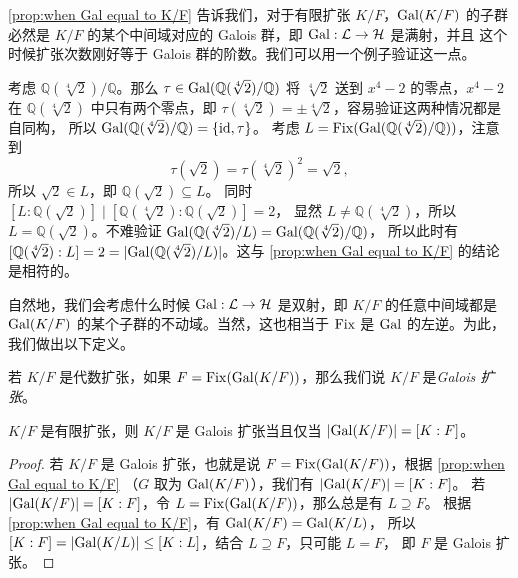 \autoref{prop:when Gal equal to K/F} 告诉我们，对于有限扩张 $K/F$，$\operatorname{Gal}(K/F)$ 的子群
必然是 $K/F$ 的某个中间域对应的 Galois 群，即 $\operatorname{Gal}:\mathcal{L}\to\mathcal{H}$ 是满射，并且
这个时候扩张次数刚好等于 Galois 群的阶数。我们可以用一个例子验证这一点。

\begin{example}
  考虑 $\mathbb{Q}(\sqrt[4]{2})/\mathbb{Q}$。那么 $\tau\in\operatorname{Gal}(\mathbb{Q}(\sqrt[4]{2})/\mathbb{Q})$
  将 $\sqrt[4]{2}$ 送到 $x^4-2$ 的零点，$x^4-2$ 在 $\mathbb{Q}(\sqrt[4]{2})$ 中只有两个零点，即
  $\tau(\sqrt[4]{2})=\pm\sqrt[4]{2}$，容易验证这两种情况都是自同构，
  所以 $\operatorname{Gal}(\mathbb{Q}(\sqrt[4]{2})/\mathbb{Q})=\{\operatorname{id},\tau\}$。
  考虑 $L=\operatorname{Fix}(\operatorname{Gal}(\mathbb{Q}(\sqrt[4]{2})/\mathbb{Q}))$，注意到
  \[
    \tau(\sqrt{2})=\tau(\sqrt[4]{2})  ^2=\sqrt{2},
  \] 
  所以 $\sqrt{2}\in L$，即 $\mathbb{Q}(\sqrt{2})\subseteq L$。
  同时 $[L:\mathbb{Q}(\sqrt{2})]\mid [\mathbb{Q}(\sqrt[4]{2}):\mathbb{Q}(\sqrt{2})]=2$，
  显然 $L\neq \mathbb{Q}(\sqrt[4]{2})$，所以 $L=\mathbb{Q}(\sqrt{2})$。不难验证
  $\operatorname{Gal}(\mathbb{Q}(\sqrt[4]{2})/L)=\operatorname{Gal}(\mathbb{Q}(\sqrt[4]{2})/\mathbb{Q})$，
  所以此时有 
  $[\mathbb{Q}(\sqrt[4]{2}):L]=2=\lvert\operatorname{Gal}(\mathbb{Q}(\sqrt[4]{2})/L)\rvert$。这与
  \autoref{prop:when Gal equal to K/F} 的结论是相符的。
\end{example}

自然地，我们会考虑什么时候 $\operatorname{Gal}:\mathcal{L}\to\mathcal{H}$ 是双射，即 $K/F$
的任意中间域都是 $\operatorname{Gal}(K/F)$ 的某个子群的不动域。当然，这也相当于
$\operatorname{Fix}$ 是 $\operatorname{Gal}$ 的左逆。为此，我们做出以下定义。

\begin{definition}
  若 $K/F$ 是代数扩张，如果 $F=\operatorname{Fix}(\operatorname{Gal}(K/F))$，那么我们说 $K/F$ 是\emph{Galois 扩张}。
\end{definition}

\begin{corollary}\label{coro:finite Galois extension}
  $K/F$ 是有限扩张，则 $K/F$ 是 Galois 扩张当且仅当 $\lvert \operatorname{Gal}(K/F)\rvert=[K:F]$。
\end{corollary}
\begin{proof}
  若 $K/F$ 是 Galois 扩张，也就是说 $F=\operatorname{Fix}(\operatorname{Gal}(K/F))$，根据 \autoref{prop:when Gal equal to K/F}
  （$G$ 取为 $\operatorname{Gal}(K/F)$），我们有 $\lvert \operatorname{Gal}(K/F)\rvert=[K:F]$。
  若 $\lvert \operatorname{Gal}(K/F)\rvert=[K:F]$，令 $L=\operatorname{Fix}(\operatorname{Gal}(K/F))$，那么总是有 $L\supseteq F$。
  根据 \autoref{prop:when Gal equal to K/F}，有 $\operatorname{Gal}(K/F)=\operatorname{Gal}(K/L)$，
  所以 $[K:F]=\lvert\operatorname{Gal}(K/L)\rvert\leq [K:L]$，结合 $L\supseteq F$，只可能 $L=F$，
  即 $F$ 是 Galois 扩张。
\end{proof}

